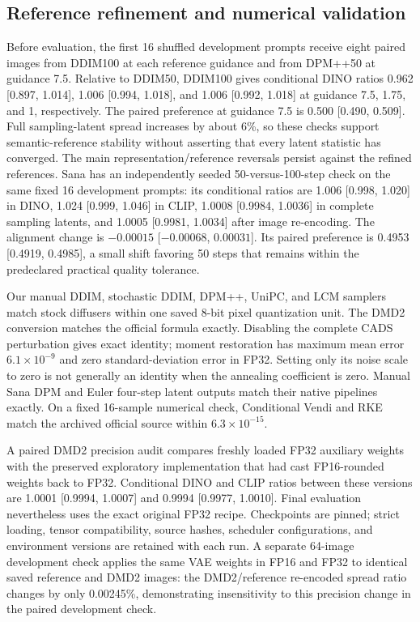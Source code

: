 \subsection{Reference refinement and numerical validation}
Before evaluation, the first 16 shuffled development prompts receive eight
paired images from DDIM100 at each reference guidance and from DPM++50 at
guidance 7.5. Relative to DDIM50, DDIM100 gives conditional DINO ratios
0.962 [0.897, 1.014], 1.006 [0.994, 1.018], and 1.006 [0.992, 1.018] at
guidance 7.5, 1.75, and 1, respectively. The paired preference at guidance
7.5 is 0.500 [0.490, 0.509]. Full sampling-latent spread increases by about
6\%, so these checks support semantic-reference stability without asserting
that every latent statistic has converged. The main representation/reference
reversals persist against the refined references. Sana has an independently
seeded 50-versus-100-step check on the same fixed 16 development prompts:
its conditional ratios are 1.006 [0.998, 1.020] in DINO,
1.024 [0.999, 1.046] in CLIP, 1.0008 [0.9984, 1.0036] in complete sampling
latents, and 1.0005 [0.9981, 1.0034] after image re-encoding. The alignment
change is $-0.00015$ [$-0.00068$, $0.00031$].
Its paired preference is 0.4953 [0.4919, 0.4985], a small shift favoring
50 steps that remains within the predeclared practical quality tolerance.

Our manual DDIM, stochastic DDIM, DPM++, UniPC, and LCM samplers match stock
diffusers within one saved 8-bit pixel quantization unit. The DMD2 conversion
matches the official formula exactly. Disabling the complete CADS perturbation
gives exact identity; moment restoration has maximum mean error
$6.1\!\times\!10^{-9}$ and zero standard-deviation error in FP32.
Setting only its noise scale to zero is not generally an identity when the
annealing coefficient is zero. Manual Sana DPM and Euler four-step latent
outputs match their native pipelines exactly. On a fixed 16-sample numerical
check, Conditional Vendi and RKE match the archived official source within
$6.3\!\times\!10^{-15}$.

A paired DMD2 precision audit compares freshly loaded FP32 auxiliary weights
with the preserved exploratory implementation that had cast FP16-rounded
weights back to FP32. Conditional DINO and CLIP ratios between these versions
are 1.0001 [0.9994, 1.0007] and 0.9994 [0.9977, 1.0010]. Final evaluation
nevertheless uses the exact original FP32 recipe. Checkpoints are pinned;
strict loading, tensor compatibility, source hashes, scheduler configurations,
and environment versions are retained with each run. A separate 64-image
development check applies the same VAE weights in FP16 and FP32 to identical
saved reference and DMD2 images: the DMD2/reference re-encoded spread ratio
changes by only 0.00245\%, demonstrating insensitivity to this precision
change in the paired development check.

